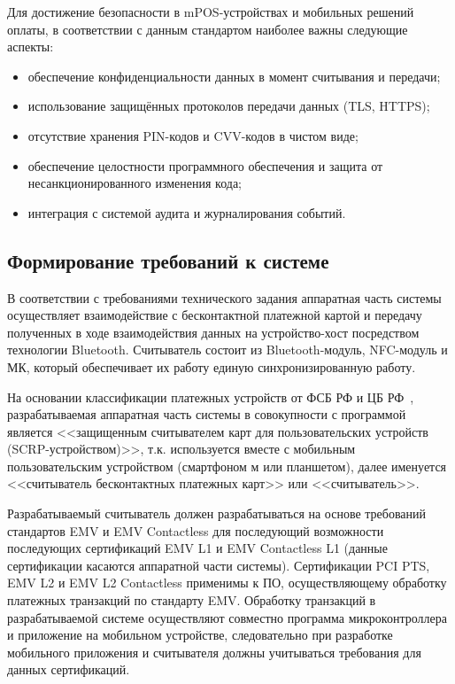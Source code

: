 Для достижение безопасности в mPOS-устройствах и мобильных решений оплаты, в соответствии с данным стандартом наиболее важны следующие аспекты:

\begin{itemize}
    \item обеспечение конфиденциальности данных в момент считывания и передачи;
    \item использование защищённых протоколов передачи данных (TLS, HTTPS);
    \item отсутствие хранения PIN-кодов и CVV-кодов в чистом виде;
    \item обеспечение целостности программного обеспечения и защита от несанкционированного изменения кода;
    \item интеграция с системой аудита и журналирования событий.
\end{itemize}


\subsection{Формирование требований к системе}

В соответствии с требованиями технического задания аппаратная часть системы осуществляет взаимодействие с бесконтактной платежной картой и передачу полученных в ходе взаимодействия данных на устройство-хост посредством технологии Bluetooth.
Считыватель состоит из Bluetooth-модуль, NFC-модуль и МК, который обеспечивает их работу единую синхронизированную работу.

На основании классификации платежных устройств от ФСБ РФ и ЦБ РФ~\cite{cbr_requirements}, разрабатываемая аппаратная часть системы в совокупности с программой является <<защищенным считывателем карт для пользовательских устройств (SCRP-устройством)>>, т.к. используется вместе с мобильным пользовательским устройством (смартфоном м или планшетом), далее именуется <<считыватель бесконтактных платежных карт>> или <<считыватель>>.

Разрабатываемый считыватель должен разрабатываться на основе требований стандартов EMV и EMV Contactless для последующий возможности последующих сертификаций EMV L1 и EMV Contactless L1 (данные сертификации касаются аппаратной части системы).
Сертификации PCI PTS, EMV L2 и EMV L2 Contactless применимы к ПО, осуществляющему обработку платежных транзакций по стандарту EMV.
Обработку транзакций в разрабатываемой системе осуществляют совместно программа микроконтроллера и приложение на мобильном устройстве, следовательно при разработке мобильного приложения и считывателя должны учитываться требования для данных сертификаций.

